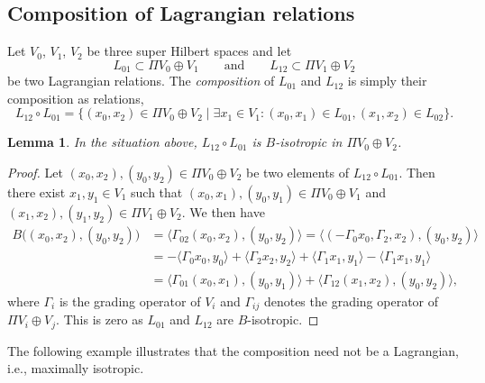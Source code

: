 \documentclass[pdftex]{sigma}
\numberwithin{equation}{section}
\newtheorem{Lemma}[Theorem]{Lemma}
\begin{document}
\subsection{Composition of Lagrangian relations}


\begin{Definition}
Let $V_0$, $V_1$, $V_2$ be three super Hilbert spaces
and let
\begin{equation*}
L_{01} \subset \Pi V_0 \oplus V_1 \qquad \text{and} \qquad L_{12} \subset \Pi V_1 \oplus V_2
\end{equation*}
 be two Lagrangian relations.
The \emph{composition} of $L_{01}$ and $L_{12}$ is simply their composition as relations,
\begin{equation*}
 L_{12} \circ L_{01} = \bigl\{ (x_0, x_2) \in \Pi V_0 \oplus V_2 \mid \exists x_1 \in V_1 \colon (x_0, x_1) \in L_{01}, (x_1, x_2) \in L_{02}\bigr\}.
\end{equation*}
\end{Definition}

\begin{Lemma} \label{LemmaCompositionIsotropic}
In the situation above, $L_{12} \circ L_{01}$ is $B$-isotropic in $\Pi V_0 \oplus V_2$.
\end{Lemma}

\begin{proof}
Let $(x_0, x_2), (y_0, y_2) \in \Pi V_0 \oplus V_2$ be two elements of $L_{12} \circ L_{01}$.
Then there exist $x_1, y_1 \in V_1$ such that $(x_0, x_1), (y_0, y_1) \in \Pi V_0 \oplus V_1$ and $(x_1, x_2), (y_1, y_2) \in \Pi V_1 \oplus V_2$.
We then have
\begin{align*}
B\bigl((x_0, x_2), (y_0, y_2)\bigr)
 &=\langle \Gamma_{02} (x_0, x_2), (y_0, y_2)\rangle = \bigl\langle (-\Gamma_0 x_0, \Gamma_2, x_2), (y_0, y_2) \bigr\rangle \\
 &= - \langle \Gamma_0 x_0, y_0\rangle + \langle \Gamma_2 x_2, y_2 \rangle + \langle \Gamma_1 x_1, y_1 \rangle - \langle \Gamma_1 x_1, y_1 \rangle\\
 &= \langle \Gamma_{01}(x_0, x_1), (y_0, y_1) \rangle + \langle \Gamma_{12} (x_1, x_2), (y_0, y_2) \rangle,
\end{align*}
where $\Gamma_i$ is the grading operator of $V_i$ and $\Gamma_{ij}$ denotes the grading operator of $\Pi V_i \oplus V_j$.
This is zero as $L_{01}$ and $L_{12}$ are $B$-isotropic.
\end{proof}

The following example illustrates that the composition need not be a Lagrangian, i.e., maximally isotropic.
\end{document}
